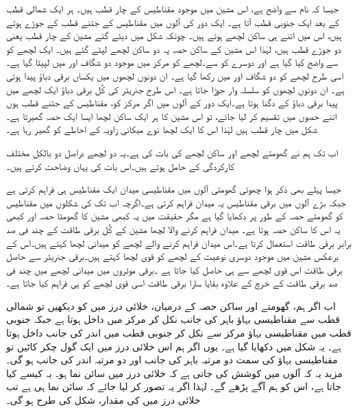  جیسا کہ نام سے واضح ہے، اس مشین میں موجود  مقناطیس کے چار قطب  ہیں۔ ہر ایک شمالی قطب کے بعد ایک جنوبی قطب آتا ہے۔ ایک دور کی آلوں میں مقناطیس کے جتنے  قطب کے جوڑے ہوتے ہیں، اس میں  اتنے ہی ساکن لچھے ہوتے ہیں۔ چونکہ شکل  میں دیئے گئے مشین کے چار قطب یعنی دو جوڑے قطب ہیں،  لہٰذا اس مشین کے ساکن حصہ پہ دو ساکن لچھے لپٹے  گئے ہیں۔ ایک لچھے کو  سے واضح کیا گیا ہے اور دوسرے کو  سے۔لچھے  کو  مرکز میں موجود دو شگاف  اور  میں لپیٹا گیا ہے۔ اسی طرح  لچھے کو دو شگاف  اور  میں رکھا گیا ہے۔ ان دونوں لچھوں میں یکساں برقی دباؤ پیدا ہوتی ہے۔ ان دونوں لچھوں کو سلسلہ وار جوڑا جاتا ہے۔ اس طرح جنریٹر کی کُل برقی دباؤ ایک لچھے میں پیدا  برقی دباؤ کے دگنا ہوتا ہے۔ایک دور کے آلوں میں  اگر مرکز کو، مقناطیس کے جتنے قطب ہوں اتنے حصوں میں تقسیم کر لیا جائے، تو اس مشین کا ہر ایک ساکن لچھا ایسا ایک حصہ گھیرتا ہے۔ شکل میں چار  قطب  ہیں  لہٰذا اس کا ایک لچھا  نوے میکانی زاویہ کے احاطے کو گھیر رہا ہے۔

اب تک ہم نے گھومتے لچھے اور ساکن لچھے کی بات کی ہے۔یہ دو لچھے دراصل دو بالکل مختلف کارکردگی کے حامل ہوتے ہیں۔اس بات کی  یہاں وضاحت کرتے ہیں۔

جیسا پہلے بھی ذکر ہوا چھوٹی گھومتی آلوں میں مقناطیسی میدان ایک مقناطیس ہی فراہم کرتی ہے جبکہ بڑے آلوں میں برقی مقناطیس یہ میدان فراہم کرتی ہے۔اگرچہ اب تک کی شکلوں میں مقناطیس کو گھومتے حصہ کے طور پر دکھایا گیا ہے مگر حقیقت میں یہ کبھی مشین کا گھومتا حصہ اور کبھی یہ اس کا ساکن حصہ ہوتا ہے۔ میدان فراہم کرنے والا لچھا مشین کے کُل برقی طاقت کے چند فی صد برابر برقی طاقت استعمال کرتا ہے۔اس  میدان فراہم کرنے والے لچھے کو میدانی لچھا  کہتے ہیں۔اس کے برعکس مشین میں موجود دوسری نوعیت کے لچھے کو قوی لچھا  کہتے ہیں۔برقی جنریٹر سے حاصل برقی طاقت اس قوی لچھے سے ہی حاصل کیا جاتا ہے ۔برقی موٹروں میں میدانی لچھے میں چند فی صد برقی طاقت کے خرچ کے علاوہ بقایا سارا برقی طاقت اسی قوی لچھے کو ہی فراہم کیا جاتا ہے۔

اب اگر ہم، گھومتے اور ساکن حصہ کے درمیان، خلائی درز میں  کو دیکھیں تو شمالی قطب سے مقناطیسی بہاؤ باہر کی جانب  نکل کر  مرکز میں داخل ہوتا ہے جبکہ جنوبی قطب میں مقناطیسی بہاؤ مرکز سے نکل کر جنوبی قطب میں اندر کی جانب داخل ہوتا ہے۔ یہ شکل  میں دکھایا گیا ہے۔ یوں اگر ہم اس خلائی درز میں ایک گول چکر کاٹیں تو مقناطیسی بہاؤ کی سمت  دو مرتبہ باہر کی جانب اور دو مرتبہ اندر کی جانب ہو گی۔ مزید یہ کہ   آلوں میں کوشش کی جاتی ہے کہ خلائی درز میں  سائن نما ہو۔ یہ کیسے کیا جاتا ہے، اس کو ہم آگے پڑھے گے۔  لہٰذا اگر یہ تصور کر لیا جائے کہ  سائن نما ہی ہے تب  خلائی درز میں  کی مقدار، شکل  کی طرح ہو گی۔ 

